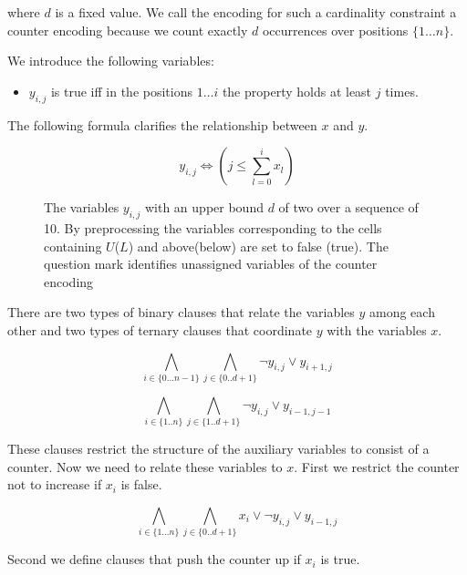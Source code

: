 \documentclass[]{llncs}
\begin{document}
where $d$ is a fixed value.  We call the encoding for such a cardinality
constraint a counter encoding because we count exactly $d$ occurrences
over positions $\{1\ldots n\}$. 

We introduce the following variables: 

\begin{itemize}
    \item $y_{i,j}$ is true iff in the positions $1 \ldots i$ the
        property holds at least $j$ times.        
\end{itemize}

The following formula clarifies the relationship between $x$ and $y$.

$$ y_{i,j} \iff (j \leq \sum_{l=0}^{i} x_{l}) $$


\begin{figure}
\centering 
\caption{The variables $y_{i,j}$ with an upper bound $d$ of two over a
    sequence of 10. By preprocessing the variables corresponding to the
    cells containing $U$($L$) and above(below) are set to false (true).
    The question mark identifies unassigned variables of the counter
    encoding}

\end{figure}

There are two types of binary clauses that relate the variables $y$ among
each other and two types of ternary clauses that coordinate $y$ with the
variables $x$.

\begin{equation}
    \bigwedge_{i \in \{0\ldots n-1\}} \bigwedge_{j \in\{0..d+1\}}
    \neg y_{i,j} \vee y_{i+1,j}
\end{equation}

\begin{equation}
    \bigwedge_{i \in \{1..n\}} \bigwedge_{j\in \{1..d+1\}}
    \neg y_{i,j} \vee y_{i-1,j-1}
\end{equation}

These clauses restrict the structure of the auxiliary variables to
consist of a counter. Now we need to relate these variables to $x$. 
First we restrict the counter not to increase if $x_{i}$ is
false. 


\begin{equation}
    \bigwedge_{i \in \{1\ldots n\}} \bigwedge_{j\in\{0..d+1\}}
    x_{i} \vee \neg y_{i,j} \vee y_{i-1,j}
\end{equation}

Second we define clauses that push  the counter up if $x_i$ is true. 
\end{document}
